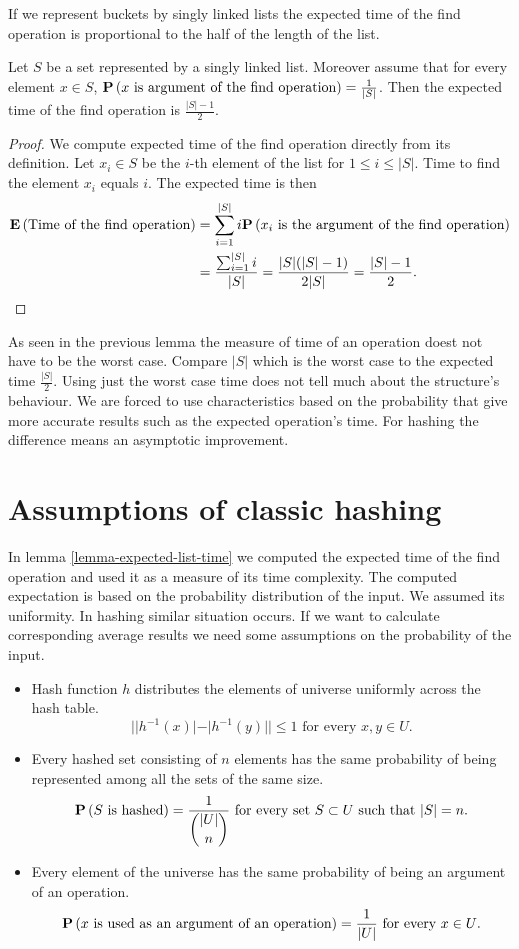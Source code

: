 If we represent buckets by singly linked lists the expected time of the find operation is proportional to the half of the length of the list.
\begin{lemma}
\label{lemma-expected-list-time}
Let $S$ be a set represented by a singly linked list. Moreover assume that for every element $x \in S$, $\mathbf{P}\left(x \text{ is argument of the find operation}\right) = \frac{1}{|S|}$. Then the expected time of the find operation is $\frac{|S| - 1}{2}$.
\end{lemma}
\begin{proof}
We compute expected time of the find operation directly from its definition. Let $x_i \in S$ be the $i$-th element of the list for $1 \leq i \leq |S|$. Time to find the element $x_i$ equals $i$. The expected time is then
\[
\begin{split}
\mathbf{E}\left(\text{Time of the find operation}\right) 
	& = \displaystyle\sum_{i = 1}^{|S|} i \mathbf{P}\left(x_i \text{ is the argument of the find operation}\right) \\
	& = \frac{\sum_{i = 1}^{|S|}{i}}{|S|} = \frac{|S|(|S| - 1)}{2 |S|} = \frac{|S| - 1}{2} \text{.}
\end{split}
\]
\end{proof}

As seen in the previous lemma the measure of time of an operation doest not have to be the worst case. Compare $|S|$ which is the worst case to the expected time $\frac{|S|}{2}$. Using just the worst case time does not tell much about the structure's behaviour. We are forced to use characteristics based on the probability that give more accurate results such as the expected operation's time. For hashing the difference means an asymptotic improvement.

\section{Assumptions of classic hashing}
In lemma \ref{lemma-expected-list-time} we computed the expected time of the find operation and used it as a measure of its time complexity. The computed expectation is based on the probability distribution of the input. We assumed its uniformity. In hashing similar situation occurs. If we want to calculate corresponding average results we need some assumptions on the probability of the input.
\begin{itemize}
\item Hash function $h$ distributes the elements of universe uniformly across the hash table.
\[
||h^{-1}(x)| - |h^{-1}(y)|| \leq 1 \text{ for every }x, y \in U \text{.}
\]
\item Every hashed set consisting of $n$ elements has the same probability of being represented among all the sets of the same size.
\[
\mathbf{P}\left(S \text{ is hashed}\right) = \frac{1}{\dbinom{|U|}{n}} \text{ for every set } S \subset U \text{ such that } |S| = n \text{.}
\]
\item Every element of the universe has the same probability of being an argument of an operation.
\[
\mathbf{P}\left(x \text{ is used as an argument of an operation}\right) = \frac{1}{|U|} \text{ for every } x \in U \text{.}
\]
\end{itemize}

